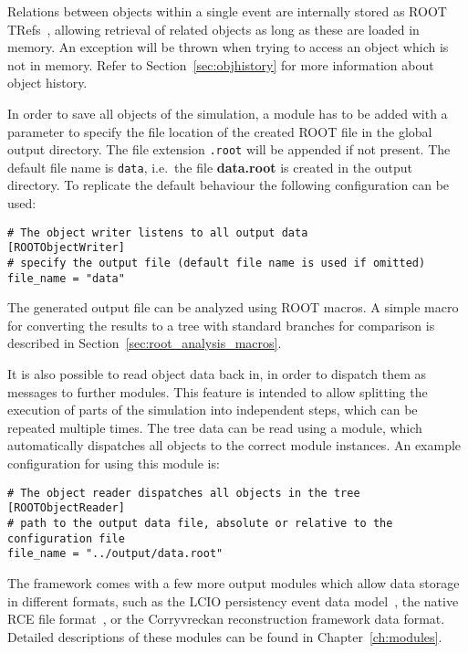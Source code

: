 Relations between objects within a single event are internally stored as ROOT TRefs~\cite{roottref}, allowing retrieval of related objects as long as these are loaded in memory.
An exception will be thrown when trying to access an object which is not in memory.
Refer to Section~\ref{sec:objhistory} for more information about object history.

In order to save all objects of the simulation, a  module has to be added with a  parameter to specify the file location of the created ROOT file in the global output directory.
The file extension \texttt{.root} will be appended if not present.
The default file name is \texttt{data}, i.e.\ the file \textbf{data.root} is created in the output directory.
To replicate the default behaviour the following configuration can be used:
\begin{verbatim}
# The object writer listens to all output data
[ROOTObjectWriter]
# specify the output file (default file name is used if omitted)
file_name = "data"
\end{verbatim}
The generated output file can be analyzed using ROOT macros.
A simple macro for converting the results to a tree with standard branches for comparison is described in Section~\ref{sec:root_analysis_macros}.

It is also possible to read object data back in, in order to dispatch them as messages to further modules.
This feature is intended to allow splitting the execution of parts of the simulation into independent steps, which can be repeated multiple times.
The tree data can be read using a  module, which automatically dispatches all objects to the correct module instances.
An example configuration for using this module is:
\begin{verbatim}
# The object reader dispatches all objects in the tree
[ROOTObjectReader]
# path to the output data file, absolute or relative to the configuration file
file_name = "../output/data.root"
\end{verbatim}

The \apsq framework comes with a few more output modules which allow data storage in different formats, such as the LCIO persistency event data model~\cite{lcio}, the native RCE file format~\cite{rce}, or the Corryvreckan reconstruction framework data format.
Detailed descriptions of these modules can be found in Chapter~\ref{ch:modules}.
